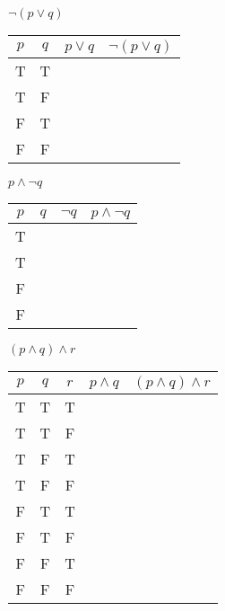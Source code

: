 \begin{questions}
  \begin{minipage}{0.45\linewidth}
    \question $\lnot(p \lor q)$ \\ 
    \vspace{.01in}
      \begin{tabular}{ |c|c|c|c| } 
        \hline
        $p$ & $q$ & $p \lor q$ & $\lnot(p \lor q)$ \\ 
        \hline
        T & T & & \\ 
        T & F & & \\ 
        F & T & & \\ 
        F & F & & \\ 
        \hline
    \end{tabular}
    \vspace{0.01in}
  \end{minipage}
  \hfill
  \begin{minipage}{0.45\linewidth}
    \question $p \land \lnot q$ \\
      \vspace{.01in}
      \begin{tabular}{ |c|c|c|c| }
        \hline 
        $p$ & $q$ & $\lnot q$ & $p \land \lnot q$ \\
        \hline 
        T & & & \\
        T & & & \\
        F & & & \\
        F & & & \\
        \hline
      \end{tabular}
  \end{minipage}  

    
  \question $(p \land q) \land r$ \\
  \vspace{0.1in}
  \begin{tabular}{ |c|c|c|c|c| }
    \hline 
    $p$ & $q$ & $r$ & $p \land q$ & $(p \land q) \land r$ \\
    \hline 
    T & T &T& & \\
    T & T &F& & \\
    T & F &T& & \\
    T & F &F& & \\
    F & T &T& & \\
    F & T &F& & \\
    F & F &T& & \\
    F & F &F& & \\
    \hline
  \end{tabular}
\end{questions}


